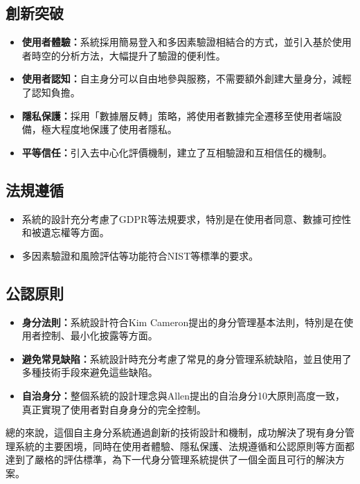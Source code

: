 \subsection{創新突破}
\begin{itemize}
  \item \textbf{使用者體驗：}系統採用簡易登入和多因素驗證相結合的方式，並引入基於使用者時空的分析方法，大幅提升了驗證的便利性。
  \item \textbf{使用者認知：}自主身分可以自由地參與服務，不需要額外創建大量身分，減輕了認知負擔。
  \item \textbf{隱私保護：}採用「數據層反轉」策略，將使用者數據完全遷移至使用者端設備，極大程度地保護了使用者隱私。
  \item \textbf{平等信任：}引入去中心化評價機制，建立了互相驗證和互相信任的機制。
\end{itemize}
\subsection{法規遵循}
\begin{itemize}
  \item 系統的設計充分考慮了GDPR等法規要求，特別是在使用者同意、數據可控性和被遺忘權等方面。
  \item 多因素驗證和風險評估等功能符合NIST等標準的要求。
\end{itemize}
\subsection{公認原則}
\begin{itemize}
  \item \textbf{身分法則：}系統設計符合Kim Cameron提出的身分管理基本法則，特別是在使用者控制、最小化披露等方面。
  \item \textbf{避免常見缺陷：}系統設計時充分考慮了常見的身分管理系統缺陷，並且使用了多種技術手段來避免這些缺陷。
  \item \textbf{自治身分：}整個系統的設計理念與Allen提出的自治身分10大原則高度一致，真正實現了使用者對自身身分的完全控制。
\end{itemize}
總的來說，這個自主身分系統通過創新的技術設計和機制，成功解決了現有身分管理系統的主要困境，同時在使用者體驗、隱私保護、法規遵循和公認原則等方面都達到了嚴格的評估標準，為下一代身分管理系統提供了一個全面且可行的解決方案。
